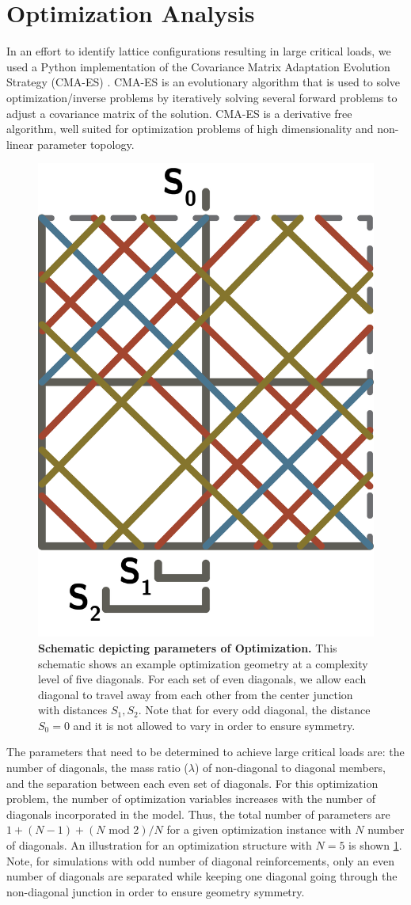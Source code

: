 \documentclass[10pt,twoside]{fernandes_supp}
\begin{document}
\section{Optimization Analysis}
In an effort to identify lattice configurations resulting in large critical loads, we used a Python implementation of the Covariance Matrix Adaptation Evolution Strategy (CMA-ES) \citep{hansen2003}. CMA-ES is an evolutionary
algorithm that is used to solve optimization/inverse problems by iteratively solving several forward problems to adjust a covariance matrix of the solution. CMA-ES is a derivative free algorithm, well suited for optimization problems of high dimensionality and non-linear parameter topology.

\begin{figure}
	\centering
	\includegraphics[width=0.25\linewidth]{SFig11.png}
	\caption{{\bf Schematic depicting parameters of Optimization.} This schematic shows an example optimization geometry  at a complexity level of five diagonals. For each set of even diagonals, we allow each diagonal to travel away from each other from the center junction with distances $S_1,S_2$. Note that for every odd diagonal, the distance $S_0=0$ and it is not allowed to vary in order to ensure symmetry.}
	\label{OptimizationSchematic}
\end{figure}

The parameters that need to be determined to achieve large critical loads are: the number of diagonals, the mass ratio ($\lambda$) of non-diagonal to diagonal members, and the separation between each even set of diagonals. For this optimization problem, the number of optimization variables increases with the number of diagonals incorporated in the model. Thus, the total number of parameters are $1+(N-1) + (N \text{ mod } 2)/N$ for a given optimization instance with $N$ number of diagonals. An illustration for an optimization structure with $N=5$ is shown \cref{OptimizationSchematic}. Note, for simulations with odd number of diagonal reinforcements, only an even number of diagonals are separated while keeping one diagonal going through the non-diagonal junction in order to ensure geometry symmetry. 
\end{document}

